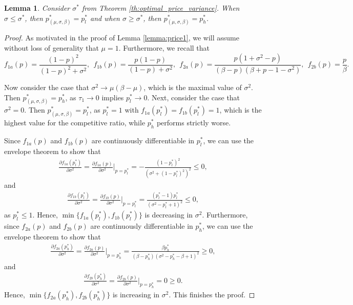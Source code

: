\documentclass[11pt]{article}
\newtheorem{lemma}{Lemma}[section]
\newcommand{\1}{\mathds{1}}
\begin{document}
\begin{lemma}
    Consider $\sigma^*$ from \textup{Theorem \ref{th:optimal_price_variance}}. When $\sigma \leq \sigma^*$, then $p^*_{(\mu,\sigma,\beta)} = p^*_l$ and when $\sigma \geq \sigma^*$, then $p^*_{(\mu,\sigma,\beta)} = p^*_h$.
\end{lemma}
\begin{proof}
    As motivated in the proof of Lemma \ref{lemma:price1}, we will assume without loss of generality that $\mu=1$. Furthermore, we recall that $$f_{1a}(p) = \frac{(1-p)^2}{(1-p)^2+\sigma^2},\ \ f_{1b}(p) = \frac{p(1-p)}{(1-p)+\sigma^2},\ \ f_{2a}(p) = \frac{p(1+\sigma^2-p)}{(\beta-p)(\beta+p-1-\sigma^2)}, \ \ f_{2b}(p) = \frac{p}{\beta}.$$

    Now consider the case that $\sigma^2 \xrightarrow{} \mu(\beta-\mu)$, which is the maximal value of $\sigma^2$. Then $p^*_{(\mu,\sigma,\beta)} = p^*_h$, as $\tau_1 \xrightarrow{} 0$ implies $p^*_l \xrightarrow{} 0$. Next, consider the case that $\sigma^2 = 0$. Then $p^*_{(\mu,\sigma,\beta)} = p^*_l$, as $p^*_l = 1$ with $f_{1a}(p^*_l) = f_{1b}(p^*_l) = 1$, which is the highest value for the competitive ratio, while $p^*_h$ performs strictly worse.
    
    Since $f_{1a}(p)$ and $f_{1b}(p)$ are continuously differentiable in $p^*_l$, we can use the envelope theorem to show that
    \begin{align}
        \frac{\partial f_{1a}(p^*_l)}{\partial \sigma^2} = \frac{\partial f_{1a}(p)}{\partial\sigma^2}\biggr\rvert_{p = p^*_l} = -\frac{\left(1 - p^*_l\right)^{2}}{\left(\sigma^2 + \left(1 - p^*_l\right)^{2}\right)^{2}} \leq 0,
    \end{align}
    and
    \begin{align}
        \frac{\partial f_{1b}(p^*_l)}{\partial \sigma^2} = \frac{\partial f_{1b}(p)}{\partial\sigma^2}\biggr\rvert_{p = p^*_l} = \frac{\left(p^*_l - 1\right) p^*_l}{\left(\sigma^2 - p^*_l + 1\right)^{2}} \leq 0,
    \end{align}
    as $p^*_l \leq 1$. Hence, $\min\{f_{1a}(p^*_l),f_{1b}(p^*_l)\}$ is decreasing in $\sigma^2$. Furthermore, since $f_{2a}(p)$ and $f_{2b}(p)$ are continuously differentiable in $p^*_h$, we can use the envelope theorem to show that
    \begin{align}
        \frac{\partial f_{2a}(p^*_h)}{\partial \sigma^2} = \frac{\partial f_{2a}(p)}{\partial\sigma^2}\biggr\rvert_{p = p^*_h} = \frac{\beta p^*_h}{(\beta-p^*_h)(\sigma^2-p^*_h-\beta+1)^2} \geq 0,
    \end{align}
    and
    \begin{align}
        \frac{\partial f_{2b}(p^*_h)}{\partial \sigma^2} = \frac{\partial f_{2b}(p)}{\partial\sigma^2}\biggr\rvert_{p = p^*_h} = 0 \geq 0.
    \end{align}
    Hence, $\min\{f_{2a}(p^*_h),f_{2b}(p^*_h)\}$ is increasing in $\sigma^2$. This finishes the proof.
\end{proof}
\end{document}
